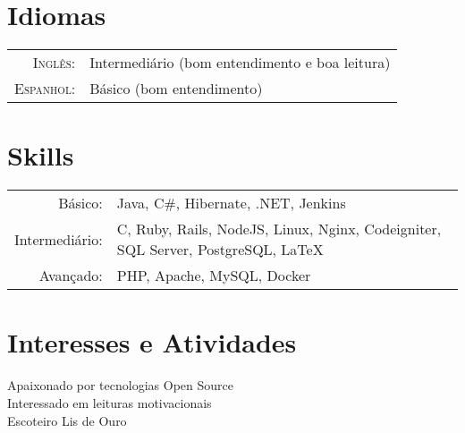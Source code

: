 \documentclass[a4paper,10pt]{article}
\begin{document}
\section{Idiomas}
\begin{tabular}{rl}
\textsc{Inglês:}&Intermediário (bom entendimento e boa leitura)\\
\textsc{Espanhol:}&Básico (bom entendimento)\\
\end{tabular}

\section{Skills}
\begin{tabular}{rl}
 Básico:& Java, C\#, Hibernate, .NET, Jenkins \setmainfont[SmallCapsFont=Fontin-SmallCaps.otf]{Fontin.otf}\\
 Intermediário:& C, Ruby, Rails, NodeJS, Linux, Nginx, Codeigniter, SQL Server, PostgreSQL, \LaTeX \\
 Avançado:& PHP, Apache, MySQL, Docker
\end{tabular}

\section{Interesses e Atividades}
Apaixonado por tecnologias Open Source\\
Interessado em leituras motivacionais \\
Escoteiro Lis de Ouro \\
\end{document}
